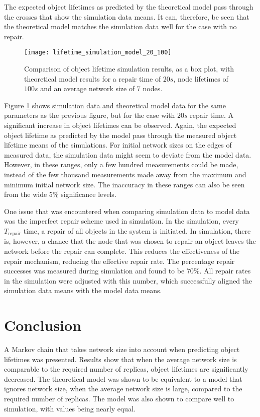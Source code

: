 The expected object lifetimes as predicted by the theoretical model pass through the crosses that show the simulation data means. It can, therefore, be seen that the theoretical model matches the simulation data well for the case with no repair.

\begin{figure}[htbp]
 \centering
 \texttt{[image: lifetime\_simulation\_model\_20\_100]}
 \caption{Comparison of object lifetime simulation results, as a box plot, with theoretical model results for a repair time of $20 s$, node lifetimes of $100 s$ and an average network size of 7 nodes.}
 \label{fig_lifetime_simulation_model_20_100}
\end{figure}
%
Figure \ref{fig_lifetime_simulation_model_20_100} shows simulation data and theoretical model data for the same parameters as the previous figure, but for the case with $20 s$ repair time. A significant increase in object lifetimes can be observed. Again, the expected object lifetime as predicted by the model pass through the measured object lifetime means of the simulations. For initial network sizes on the edges of measured data, the simulation data might seem to deviate from the model data. However, in these ranges, only a few hundred measurements could be made, instead of the few thousand measurements made away from the maximum and minimum initial network size. The inaccuracy in these ranges can also be seen from the wide 5\% significance levels.

One issue that was encountered when comparing simulation data to model data was the imperfect repair scheme used in simulation. In the simulation, every $T_{\textrm{repair}}$ time, a repair of all objects in the system is initiated. In simulation, there is, however, a chance that the node that was chosen to repair an object leaves the network before the repair can complete. This reduces the effectiveness of the repair mechanism, reducing the effective repair rate. The percentage repair successes was measured during simulation and found to be $70 \%$. All repair rates in the simulation were adjusted with this number, which successfully aligned the simulation data means with the model data means.

\section{Conclusion}

A Markov chain that takes network size into account when predicting object lifetimes was presented. Results show that when the average network size is comparable to the required number of replicas, object lifetimes are significantly decreased. The theoretical model was shown to be equivalent to a model that ignores network size, when the average network size is large, compared to the required number of replicas. The model was also shown to compare well to simulation, with values being nearly equal.

